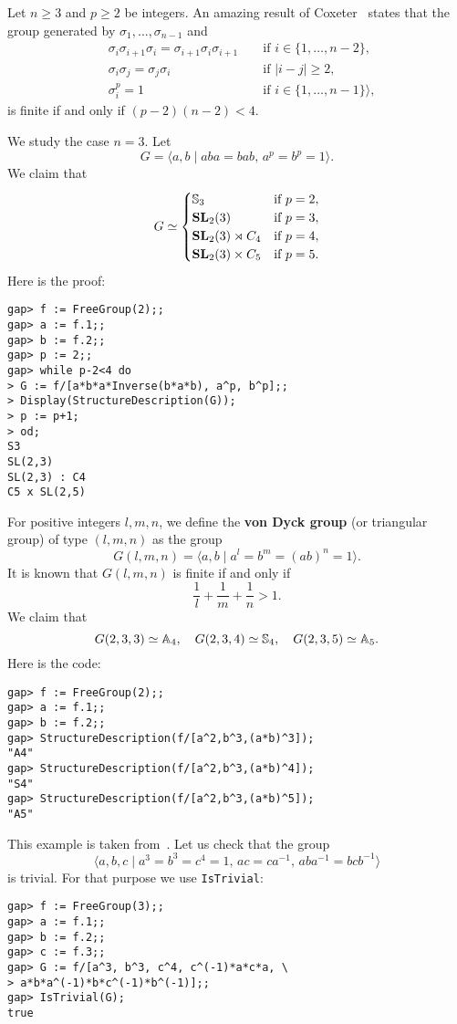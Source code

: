 \begin{example}
\label{xca:Coxeter}
Let $n\geq3$ and $p\geq2$ be integers. An amazing result of
Coxeter~\cite{MR1330458} states that the group generated by
$\sigma_1,\dots,\sigma_{n-1}$ and 
\begin{align*}
    &\sigma_i\sigma_{i+1}\sigma_i=\sigma_{i+1}\sigma_i\sigma_{i+1} && \text{ if $i\in\{1,\dots,n-2\}$},\\
    &\sigma_i\sigma_j=\sigma_j\sigma_i && \text{ if $|i-j|\geq 2$},\\
    &\sigma_i^p=1 && \text{ if $i\in\{1,\dots,n-1\}$}\rangle,
\end{align*}
is finite if and only if $(p-2)(n-2)<4$.  

We study the case $n=3$. Let 
\[
G=\langle a,b \mid aba=bab,\,a^p=b^p=1\rangle.
\]
We claim that 
\[
G\simeq\begin{cases}
    \mathbb{S}_3 & \text{if $p=2$},\\
    \mathbf{SL}_2(3) & \text{if $p=3$},\\
    \mathbf{SL}_2(3)\rtimes C_4 & \text{if $p=4$},\\
    \mathbf{SL}_2(3)\times C_5 & \text{if $p=5$}.
\end{cases}
\]
Here is the proof:
\begin{lstlisting}
gap> f := FreeGroup(2);;
gap> a := f.1;;
gap> b := f.2;;
gap> p := 2;;
gap> while p-2<4 do
> G := f/[a*b*a*Inverse(b*a*b), a^p, b^p];;
> Display(StructureDescription(G));
> p := p+1;
> od;
S3
SL(2,3)
SL(2,3) : C4
C5 x SL(2,5)    
\end{lstlisting}
\end{example}

\begin{example}
For positive integers $l,m,n$, we define the \textbf{von Dyck group} (or triangular group)
of type $(l,m,n)$ as the group
\[
G(l,m,n)=\langle
a,b \mid a^l=b^m=(ab)^n=1\rangle.
\]
It is known that $G(l,m,n)$ is finite if and only if 
\[
\frac{1}{l}+\frac{1}{m}+\frac{1}{n}>1.
\]
We claim that 
\[
G(2,3,3)\simeq\mathbb{A}_4, \quad
G(2,3,4)\simeq\mathbb{S}_4,\quad
G(2,3,5)\simeq\mathbb{A}_5. 
\]
Here is the code:
\begin{lstlisting}
gap> f := FreeGroup(2);;
gap> a := f.1;;
gap> b := f.2;;
gap> StructureDescription(f/[a^2,b^3,(a*b)^3]);
"A4"
gap> StructureDescription(f/[a^2,b^3,(a*b)^4]);
"S4"
gap> StructureDescription(f/[a^2,b^3,(a*b)^5]);
"A5"
\end{lstlisting}
\end{example}

\begin{example}
This example is taken from~\cite{MR1786869}. Let us check that the group
\[
\langle a,b,c\mid a^3=b^3=c^4=1,\,ac=ca^{-1},\,aba^{-1}=bcb^{-1}\rangle
\]
is trivial. For that purpose we use \lstinline{IsTrivial}:
\begin{lstlisting}
gap> f := FreeGroup(3);;
gap> a := f.1;;
gap> b := f.2;;
gap> c := f.3;;
gap> G := f/[a^3, b^3, c^4, c^(-1)*a*c*a, \
> a*b*a^(-1)*b*c^(-1)*b^(-1)];;
gap> IsTrivial(G);
true
\end{lstlisting}
\end{example}

